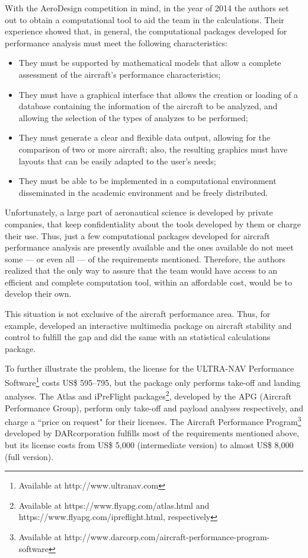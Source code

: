 \documentclass[10pt]{SelfArx} %
\begin{document}
With the AeroDesign competition in mind, in the year of 2014 the authors set out to obtain a computational tool to aid the team in the calculations. Their experience  showed that, in general, the computational packages developed for performance analysis must meet the following characteristics:
\begin{itemize} [noitemsep] %
\item They must be supported by mathematical models that allow a complete assessment of the aircraft's performance characteristics;
\item They must have a graphical interface that allows the creation or loading of a database containing the information of the aircraft to be analyzed, and  allowing the selection of the types of analyzes to be performed; 
\item They must generate a clear and flexible data output, allowing for the comparison of two or more aircraft; also, the resulting graphics must have layouts that can be easily adapted to the user's needs; 
\item They must be able to be implemented in a computational environment disseminated in the academic environment and be freely distributed. 
\end{itemize}

Unfortunately, a large part of aeronautical science is developed by private companies, that keep confidentiality about the tools developed by them or charge their use.  Thus, just a few computational packages developed for aircraft performance analysis are presently available and  the ones available do not meet some --- or even all --- of the requirements mentioned. Therefore, the  authors realized that the only way to assure that  the team would have access to an efficient and complete computation tool, within an affordable cost, would be to develop their own. 

This situation is not exclusive of the aircraft performance area. Thus, \cite{bloy} for example, developed an interactive multimedia package on aircraft stability and control to fulfill the gap and \cite{labfit} did the same with an statistical calculations package. 

To further illustrate the problem, the license for the ULTRA-NAV\textsuperscript{\textregistered} Performance Software\footnote{Available at http://www.ultranav.com} costs US\$ 595--795, but the package only performs take-off and landing analyses. The Atlas\textsuperscript{\textregistered} and iPreFlight\textsuperscript{\textregistered} packages\footnote{\raggedright{Available at https://www.flyapg.com/atlas.html  and  https://www.flyapg.com/ipreflight.html, respectively}},  developed by the APG (Aircraft Performance Group), perform only take-off and payload analyses respectively, and  charge a ``price on request" for their licenses. The Aircraft Performance Program\textsuperscript{\textregistered}\footnote{\raggedright{Available at http://www.darcorp.com/aircraft-performance-program-software}} developed by DARcorporation fulfills  most of the requirements mentioned above, but  its  license costs from US\$ 5,000 (intermediate version) to almost  US\$ 8,000 (full version).
\end{document}
